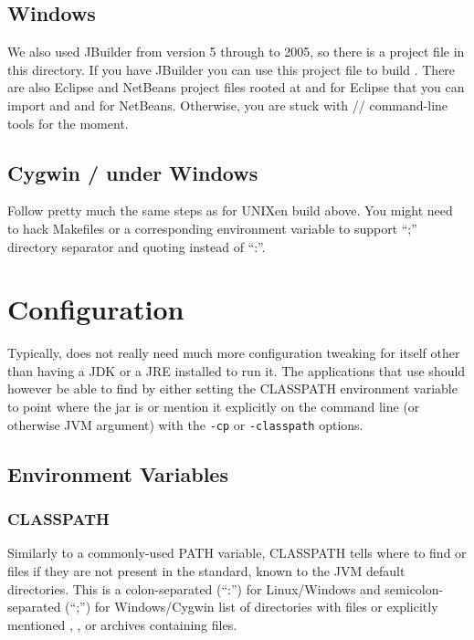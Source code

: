 \subsection{Windows}

We also used JBuilder \cite{jbuilder} from version 5 through to 2005, so there is a project file
 in this directory. If you have JBuilder you can use
this project file to build . There are also Eclipse \cite{eclipse} and
NetBeans \cite{netbeans} project files rooted at  and 
for Eclipse that you can import and  and
 for NetBeans.
Otherwise, you are stuck
with // command-line tools for the moment.

\subsection{Cygwin / under Windows}

Follow pretty much the same steps as for UNIXen build above. You
might need to hack Makefiles or a corresponding environment variable
to support ``;'' directory separator
and quoting instead of ``:''.


\section{Configuration}

Typically, {\marf} does not really need much more configuration
tweaking for itself other than having a JDK or a JRE installed
to run it. The applications that use {\marf} should however be
able to find  by either setting the CLASSPATH
environment variable to point where the jar is or mention it
explicitly on the command line (or otherwise JVM argument)
with the \texttt{-cp} or \texttt{-classpath} options.

\subsection{Environment Variables}

\subsubsection{CLASSPATH}

Similarly to a commonly-used PATH variable, CLASSPATH tells where to
find  or  files if they are not present
in the standard, known to the JVM default directories. This is a
colon-separated (``:'') for Linux/Windows and semicolon-separated (``;'')
for Windows/Cygwin list of directories with  files
or explicitly mentioned , , or 
archives containing  files.

